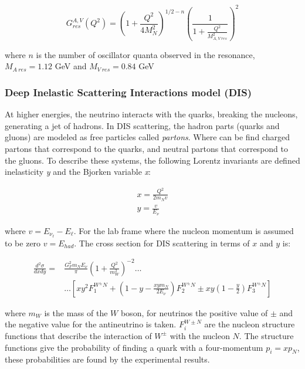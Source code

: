 \begin{equation}
    G^{A,V}_{res} (Q^2)= \left(1+ \frac{Q^2}{4M^2_N}\right)^{1/2-n}\left(\frac{1}{1+\frac{Q^2}{M^2_{A,V\ res}}} \right)^2
\end{equation}

where $n$ is the number of oscillator quanta observed in the resonance, $M_{A\ res} = 1.12$ GeV and $M_{V\ res} = 0.84$ GeV


\subsubsection{Deep Inelastic Scattering Interactions model (DIS)}
\label{Cap:Int:NuInteractions:DISmodel}

At higher energies, the neutrino interacts with the quarks, breaking the nucleons, generating a jet of hadrons. In DIS scattering, the hadron parts (quarks and gluons) are modeled as free particles called \textit{partons}. Where can be find charged partons that correspond to the quarks, and neutral partons that correspond to the gluons. To describe these systems, the following Lorentz invariants are defined inelasticity \textit{y} and the Bjorken variable \textit{x}:

\begin{equation}
    \begin{split}
        x = \frac{Q^2}{2m_N v} \\
        y = \frac{v}{E_\nu}
    \end{split}
\end{equation}

where $v= E_{\nu_\ell} - E_\ell$. For the lab frame where the nucleon momentum is assumed to be zero $v = E_{had}$.
The cross section for DIS scattering in terms of $x$ and $y$ is:

\begin{equation}
    \begin{split}
        \frac{d^2\sigma}{dxdy}= & \frac{G^2_F m_N E_\nu}{\pi}\left(1 + \frac{Q^2}{m^2_W}\right)^{-2} \dots\\
        & \dots \left[xy^2F^{W^\pm N}_1 + \left(1-y-\frac{xym_N}{2E_\nu} \right)F^{W^\pm N}_2 \pm  xy\left(1-\frac{y}{2}\right)F^{W^\pm N}_3  \right]
    \end{split}
\end{equation}

where $m_W$ is the mass of the $W$ boson, for neutrinos the positive value of $\pm$ and the negative value for the antineutrino is taken. $F^{W\pm N}_i$ are the nucleon structure functions that describe the interaction of $W^\pm$ with the nucleon $N$. The structure functions give the probability of finding a quark with a four-momentum $p_i = xp_N$, these probabilities are found by the experimental results. 

